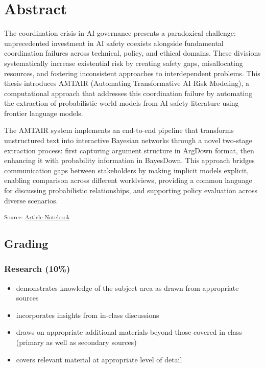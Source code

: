 \documentclass[12pt,a4paper]{report}      %
\providecommand{\tightlist}{%
  \setlength{\itemsep}{0pt}\setlength{\parskip}{0pt}}
\begin{document}


\chapter*{Abstract}\label{abstract}

The coordination crisis in AI governance presents a paradoxical
challenge: unprecedented investment in AI safety coexists alongside
fundamental coordination failures across technical, policy, and ethical
domains. These divisions systematically increase existential risk by
creating safety gaps, misallocating resources, and fostering
inconsistent approaches to interdependent problems. This thesis
introduces AMTAIR (Automating Transformative AI Risk Modeling), a
computational approach that addresses this coordination failure by
automating the extraction of probabilistic world models from AI safety
literature using frontier language models.

The AMTAIR system implements an end-to-end pipeline that transforms
unstructured text into interactive Bayesian networks through a novel
two-stage extraction process: first capturing argument structure in
ArgDown format, then enhancing it with probability information in
BayesDown. This approach bridges communication gaps between stakeholders
by making implicit models explicit, enabling comparison across different
worldviews, providing a common language for discussing probabilistic
relationships, and supporting policy evaluation across diverse
scenarios.

\textsubscript{Source:
\href{https://VJMeyer.github.io/submission/thesis.qmd.html}{Article
Notebook}}

\section{Grading}\label{grading}

\subsection{Research (10\%)}\label{research-10}

\begin{itemize}
\tightlist
\item
  demonstrates knowledge of the subject area as drawn from appropriate
  sources
\item
  incorporates insights from in-class discussions
\item
  draws on appropriate additional materials beyond those covered in
  class (primary as well as secondary sources)
\item
  covers relevant material at appropriate level of detail
\end{itemize}
\end{document}
